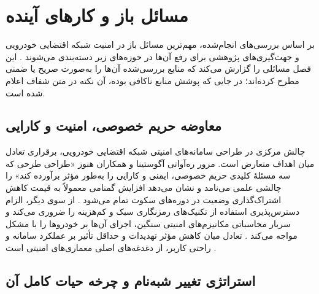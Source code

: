 \section{مسائل باز و کارهای آینده}

بر اساس بررسی‌های انجام‌شده، مهم‌ترین مسائل باز در امنیت شبکه اقتضایی خودرویی و جهت‌گیری‌های پژوهشی برای رفع آن‌ها در حوزه‌های زیر دسته‌بندی می‌شوند \cite{farsimadanReviewSecurityChallenges2025, rahmawatiagustinaSystematicLiteratureReview2025}. این فصل مسائلی را گزارش می‌کند که منابع بررسی‌شده آن‌ها را به‌صورت صریح یا ضمنی مطرح کرده‌اند؛ در جایی که پوشش منابع ناکافی بوده، آن نکته در متن شفاف اعلام شده است.

\subsection{معاوضه حریم خصوصی، امنیت و کارایی}

چالش مرکزی در طراحی سامانه‌های امنیتی شبکه اقتضایی خودرویی، برقراری تعادل میان اهداف متعارض است. مرور ره‌آواتی آگوستینا و همکاران هنوز «طراحی طرحی که سه مسئلهٔ کلیدی حریم خصوصی، ایمنی و کارایی را به‌طور مؤثر برآورده کند» را چالشی علمی می‌نامد و نشان می‌دهد افزایش گمنامی معمولاً به قیمت کاهش اشتراک‌گذاری وضعیت در دوره‌های سکوت تمام می‌شود \cite{al-aniPrivacySafetyImprovement2023}. از سوی دیگر، الزام دسترس‌پذیری استفاده از تکنیک‌های رمزنگاری سبک و کم‌هزینه را ضروری می‌کند و سربار محاسباتی مکانیزم‌های امنیتی سنگین، اجرای آن‌ها بر خودروها را با مشکل مواجه می‌کند \cite{farsimadanReviewSecurityChallenges2025}. تعادل میان کاهش مؤثر تهدیدات و حداقل تأثیر بر عملکرد سامانه و راحتی کاربر، از دغدغه‌های اصلی معماری‌های امنیتی است \cite{SecuringVehicularAd}.

\subsection{استراتژی تغییر شبه‌نام و چرخه حیات کامل آن}

